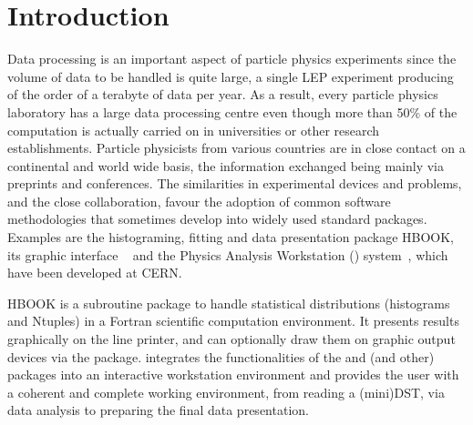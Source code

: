 
\chapter{Introduction}       
\label{HINTRO}
 
Data processing is an important aspect of particle physics experiments
since the volume of data to be handled is quite large, a single LEP 
experiment producing of the order of a terabyte of data per year.
As a result, every particle physics laboratory has a large data 
processing centre even though more than 50\% of the computation is
actually carried on in universities or other research establishments.  
Particle physicists from various countries are in close contact on 
a continental and world wide basis,
the information exchanged being mainly via preprints and conferences.
The similarities in experimental devices and problems, and the close
collaboration, favour the adoption of common software methodologies that
sometimes develop into widely used standard packages. 
Examples are the histograming, fitting and data presentation package HBOOK, its
graphic interface \HPLOT~\cite{bib-HIGZHPLOT} and the
Physics Analysis Workstation (\PAW) system~\cite{bib-PAW}, 
which have been developed at CERN.

HBOOK is a subroutine package to handle statistical distributions
(histograms and Ntuples) in a Fortran scientific computation environment. 
It presents results graphically on the line printer, and can
optionally draw them on graphic output devices via the \HPLOT{}
package.
\PAW{} integrates the functionalities of the \HBOOK{} 
and \HPLOT{} (and other) packages
into an interactive workstation environment and provides the 
user with a coherent and complete working environment, 
from reading a (mini)DST,
via data analysis to preparing the final data presentation.

